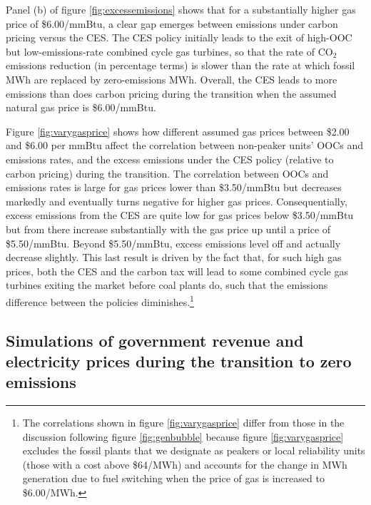 \documentclass[12pt]{article}
\begin{document}
Panel (b) of figure \ref{fig:excessemissions} shows that for a substantially higher gas price of \$6.00/mmBtu, a clear gap emerges between emissions under carbon pricing versus the CES. The CES policy initially leads to the exit of high-OOC but low-emissions-rate combined cycle gas turbines, so that the rate of CO$_2$ emissions reduction (in percentage terms) is slower than the rate at which fossil MWh are replaced by zero-emissions MWh. Overall, the CES leads to more emissions than does carbon pricing during the transition when the assumed natural gas price is \$6.00/mmBtu.



Figure \ref{fig:varygasprice} shows how different assumed gas prices between \$2.00 and \$6.00 per mmBtu affect the correlation between non-peaker units' OOCs and emissions rates, and the excess emissions under the CES policy (relative to carbon pricing) during the transition. The correlation between OOCs and emissions rates is large for gas prices lower than \$3.50/mmBtu but decreases markedly and eventually turns negative for higher gas prices. Consequentially, excess emissions from the CES are quite low for gas prices below \$3.50/mmBtu but from there increase substantially with the gas price up until a price of \$5.50/mmBtu. Beyond \$5.50/mmBtu, excess emissions level off and actually decrease slightly. This last result is driven by the fact that, for such high gas prices, both the CES and the carbon tax will lead to some combined cycle gas turbines exiting the market before coal plants do, such that the emissions difference between the policies diminishes.\footnote{The correlations shown in figure \ref{fig:varygasprice} differ from those in the discussion following figure \ref{fig:genbubble} because figure \ref{fig:varygasprice} excludes the fossil plants that we designate as peakers or local reliability units (those with a cost above \$64/MWh) and accounts for the change in MWh generation due to fuel switching when the price of gas is increased to \$6.00/MWh.}



\subsection{Simulations of government revenue and electricity prices during the transition to zero emissions}\label{sec:transition_sim_taxprice}
\end{document}

